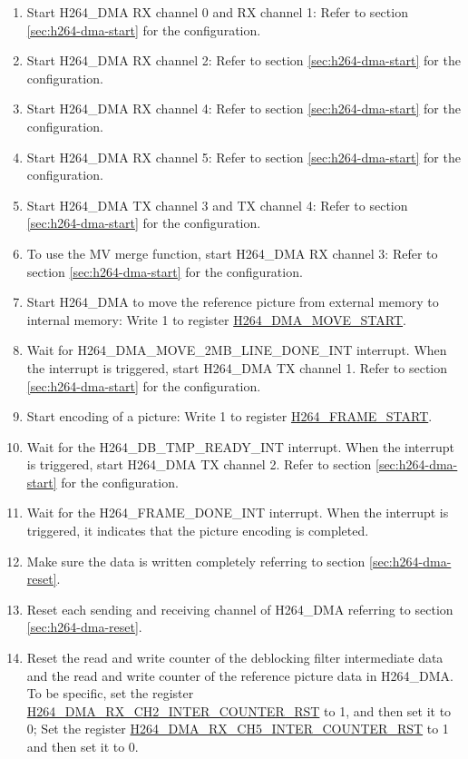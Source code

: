 \documentclass[main\_\_EN.tex]{subfiles}
\begin{document}
\begin{enumerate}
\begin{itemize}
\begin{enumerate}
            \item Start H264\_DMA RX channel 0 and RX channel 1: Refer to section \ref{sec:h264-dma-start} for the configuration.
            \item Start H264\_DMA RX channel 2: Refer to section \ref{sec:h264-dma-start} for the configuration.
            \item Start H264\_DMA RX channel 4: Refer to section \ref{sec:h264-dma-start} for the configuration.
            \item Start H264\_DMA RX channel 5: Refer to section \ref{sec:h264-dma-start} for the configuration.
            \item Start H264\_DMA TX channel 3 and TX channel 4: Refer to section \ref{sec:h264-dma-start} for the configuration.
            \item To use the MV merge function, start H264\_DMA RX channel 3: Refer to section \ref{sec:h264-dma-start} for the configuration.
            \item Start H264\_DMA to move the reference picture from external memory to internal memory: Write 1 to register \hyperref[fielddesc:H264DMAMOVESTART]{H264\_DMA\_MOVE\_START}.
            \item Wait for H264\_DMA\_MOVE\_2MB\_LINE\_DONE\_INT interrupt. When the interrupt is triggered, start H264\_DMA TX channel 1. Refer to section \ref{sec:h264-dma-start} for the configuration.
            \item Start encoding of a picture: Write 1 to register \hyperref[fielddesc:H264FRAMESTART]{H264\_FRAME\_START}.
            \item Wait for the H264\_DB\_TMP\_READY\_INT interrupt. When the interrupt is triggered, start H264\_DMA TX channel 2. Refer to section \ref{sec:h264-dma-start} for the configuration.
            \item Wait for the H264\_FRAME\_DONE\_INT interrupt. When the interrupt is triggered, it indicates that the picture encoding is completed.
            \item Make sure the data is written completely referring to section \ref{sec:h264-dma-reset}.
            \item Reset each sending and receiving channel of H264\_DMA referring to section \ref{sec:h264-dma-reset}.
            \item Reset the read and write counter of the deblocking filter intermediate data and the read and write counter of the reference picture data in H264\_DMA. To be specific, set the register \hyperref[fielddesc:H264DMARXCH2INTERCOUNTERRST]{H264\_DMA\_RX\_CH2\_INTER\_COUNTER\_RST} to 1, and then set it to 0; Set the register \hyperref[fielddesc:H264DMARXCH5INTERCOUNTERRST]{H264\_DMA\_RX\_CH5\_INTER\_COUNTER\_RST} to 1 and then set it to 0.

\end{enumerate}
\end{itemize}
\end{enumerate}
\end{document}
